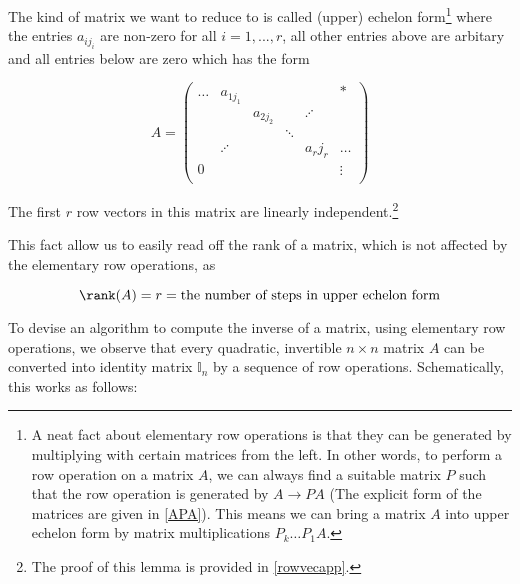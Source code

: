 \documentclass[a4paper,12pt]{report}
\begin{document}
The kind of matrix we want to reduce to is called (upper) echelon form\footnote{A neat fact about elementary row operations is that they can be generated by multiplying with certain matrices from the left. In other words, to perform a row operation on a matrix \(A\), we can always find a suitable matrix \(P\) such that the row operation is generated by \(A \rightarrow PA\) (The explicit form of the matrices are given in \cref{APA}). This means we can bring a matrix \(A\) into upper echelon form by matrix multiplications \(P_{k} \ldots P_{1}A \).}  where the entries \(a_{ij_{i} } \) are non-zero for all \(i = 1, ..., r\), all other entries above are arbitary and all entries below are zero which has the form

\begin{equation}
    A = \begin{pmatrix}
        \ldots & a_{1j_{1} }  &  &  &  & *  \\
         &  & a_{2j_{2} }  &  & \iddots    &   \\
         &  &  & \ddots  &  &   \\
         & \iddots &  &  & a_{r}j_{r}   & \ldots   \\
        0 &  &  &  &  & \vdots   \\
    \end{pmatrix}
\end{equation}


\begin{lemma} \label{rowvec} 
The first \(r\) row vectors in this matrix are linearly independent.\footnote{The proof of this lemma is provided in \cref{rowvecapp}.}
\end{lemma}



This fact allow us to easily read off the rank of a matrix, which is not affected by the elementary row operations, as

\begin{equation}
    \rank (A) = r = \text{the number of steps in upper echelon form}
\end{equation}

To devise an algorithm to compute the inverse of a matrix, using elementary row operations, we observe that every quadratic, invertible \(n \times n\) matrix \(A\) can be converted into identity matrix \(\mathbb{I}_{n} \) by a sequence of row operations. Schematically, this works as follows:
\end{document}
